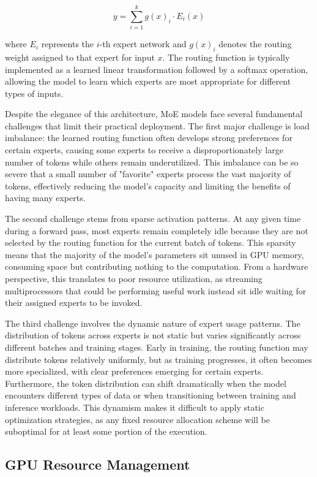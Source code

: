 \documentclass{article}
\begin{document}
\begin{equation}
y = \sum_{i=1}^{k} g(x)_i \cdot E_i(x)
\end{equation}

where $E_i$ represents the $i$-th expert network and $g(x)_i$ denotes the routing weight assigned to that expert for input $x$. The routing function is typically implemented as a learned linear transformation followed by a softmax operation, allowing the model to learn which experts are most appropriate for different types of inputs.

Despite the elegance of this architecture, MoE models face several fundamental challenges that limit their practical deployment. The first major challenge is load imbalance: the learned routing function often develops strong preferences for certain experts, causing some experts to receive a disproportionately large number of tokens while others remain underutilized. This imbalance can be so severe that a small number of "favorite" experts process the vast majority of tokens, effectively reducing the model's capacity and limiting the benefits of having many experts.

The second challenge stems from sparse activation patterns. At any given time during a forward pass, most experts remain completely idle because they are not selected by the routing function for the current batch of tokens. This sparsity means that the majority of the model's parameters sit unused in GPU memory, consuming space but contributing nothing to the computation. From a hardware perspective, this translates to poor resource utilization, as streaming multiprocessors that could be performing useful work instead sit idle waiting for their assigned experts to be invoked.

The third challenge involves the dynamic nature of expert usage patterns. The distribution of tokens across experts is not static but varies significantly across different batches and training stages. Early in training, the routing function may distribute tokens relatively uniformly, but as training progresses, it often becomes more specialized, with clear preferences emerging for certain experts. Furthermore, the token distribution can shift dramatically when the model encounters different types of data or when transitioning between training and inference workloads. This dynamism makes it difficult to apply static optimization strategies, as any fixed resource allocation scheme will be suboptimal for at least some portion of the execution.

\subsection{GPU Resource Management}
\end{document}
